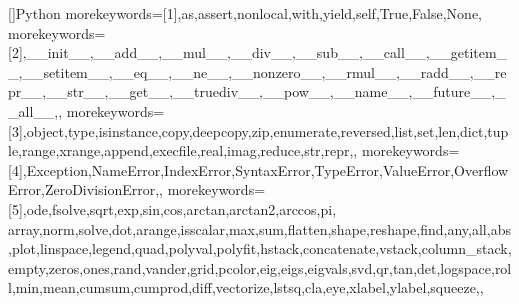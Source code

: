 \documentclass[a4paper,12pt]{article}
\begin{document}
[]{Python}{
	morekeywords=[1]{,as,assert,nonlocal,with,yield,self,True,False,None,} %
	morekeywords=[2]{,__init__,__add__,__mul__,__div__,__sub__,__call__,__getitem__,__setitem__,__eq__,__ne__,__nonzero__,__rmul__,__radd__,__repr__,__str__,__get__,__truediv__,__pow__,__name__,__future__,__all__,}, %
	morekeywords=[3]{,object,type,isinstance,copy,deepcopy,zip,enumerate,reversed,list,set,len,dict,tuple,range,xrange,append,execfile,real,imag,reduce,str,repr,}, %
	morekeywords=[4]{,Exception,NameError,IndexError,SyntaxError,TypeError,ValueError,OverflowError,ZeroDivisionError,}, %
	morekeywords=[5]{,ode,fsolve,sqrt,exp,sin,cos,arctan,arctan2,arccos,pi, array,norm,solve,dot,arange,isscalar,max,sum,flatten,shape,reshape,find,any,all,abs,plot,linspace,legend,quad,polyval,polyfit,hstack,concatenate,vstack,column_stack,empty,zeros,ones,rand,vander,grid,pcolor,eig,eigs,eigvals,svd,qr,tan,det,logspace,roll,min,mean,cumsum,cumprod,diff,vectorize,lstsq,cla,eye,xlabel,ylabel,squeeze,}, %
}

\end{document}

